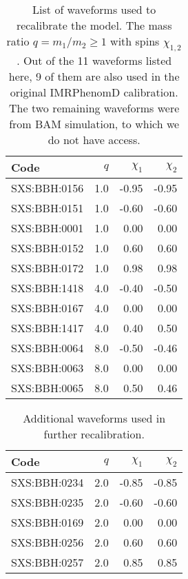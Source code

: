\documentclass[twocolumn]{aastex631}
\begin{document}
\begin{table}[t]
	\centering
	\begin{tabularx}{0.8\columnwidth}{@{\extracolsep{\fill}}lrrr}
		\toprule\midrule Code         & $q$ & $\chi_1$ & $\chi_2$ \\
		\midrule\midrule SXS:BBH:0156 & 1.0 & -0.95    & -0.95    \\
		SXS:BBH:0151 & 1.0 & -0.60    & -0.60    \\
		SXS:BBH:0001 & 1.0 &  0.00    &  0.00    \\
		SXS:BBH:0152 & 1.0 &  0.60    &  0.60    \\
		SXS:BBH:0172 & 1.0 &  0.98    &  0.98    \\
		SXS:BBH:1418 & 4.0 & -0.40    & -0.50    \\
		SXS:BBH:0167 & 4.0 &  0.00    &  0.00    \\
		SXS:BBH:1417 & 4.0 &  0.40    &  0.50    \\
		SXS:BBH:0064 & 8.0 & -0.50    & -0.46    \\
		SXS:BBH:0063 & 8.0 &  0.00    &  0.00    \\
		SXS:BBH:0065 & 8.0 &  0.50    &  0.46    \\ \midrule\bottomrule
	\end{tabularx}
	\caption{List of waveforms used to recalibrate the model. The mass ratio
	$q=m_1/m_2\geq 1$ with spins $\chi_{1,2}$. Out of the 11 waveforms listed
	here, 9 of them are also used in the original IMRPhenomD calibration.
	\citep{khan2016frequency} The two remaining waveforms were from BAM
	simulation, to which we do not have access.}
	\label{tab:q148}
\end{table}
\begin{table}[t]
	\centering
	\begin{tabularx}{0.8\columnwidth}{@{\extracolsep{\fill}}lrrr}
		\toprule\midrule Code         & $q$ & $\chi_1$ & $\chi_2$ \\
		\midrule\midrule SXS:BBH:0234 & 2.0 & -0.85    & -0.85    \\
		SXS:BBH:0235 & 2.0 & -0.60    & -0.60    \\
		SXS:BBH:0169 & 2.0 & 0.00     & 0.00     \\
		SXS:BBH:0256 & 2.0 & 0.60     & 0.60     \\
		SXS:BBH:0257 & 2.0 & 0.85     & 0.85     \\ \midrule\bottomrule
	\end{tabularx}
	\caption{Additional waveforms used in further recalibration.}
	\label{tab:q1248}
\end{table}
\end{document}
